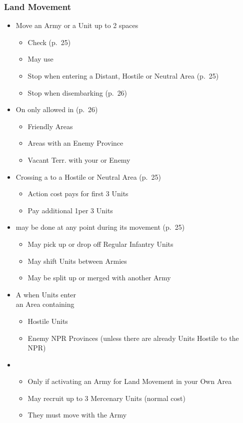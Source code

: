 \documentclass[10pt]{article}
\begin{document}
\subsubsection*{Land Movement}
\begin{itemize}
	\item Move an Army or a Unit up to 2 spaces
	\begin{itemize}
		\item {}Check  (p.~25)
		\item {}May use 
		\item Stop when entering a Distant, Hostile or Neutral Area (p.~25)
		\item Stop when disembarking (p.~26)
	\end{itemize}
	\item On  only allowed in (p.~26)
	\begin{itemize}
		\item Friendly Areas
		\item Areas with an Enemy Province
		\item Vacant Terr. with your or Enemy \claim
	\end{itemize}
	\item Crossing a  to a Hostile or Neutral Area (p.~25)
	\begin{itemize}
		\item Action cost pays for first 3 Units
		\item Pay additional 1\milpower per 3 Units
	\end{itemize}
	\item {} may be done at any point during its movement (p.~25)
	\begin{itemize}
		\item May pick up or drop off Regular Infantry Units
		\item May shift Units between Armies
		\item May be split up or merged with another Army
	\end{itemize}
	\item A  when Units enter\\
	an Area containing
	\begin{itemize}
		\item Hostile Units
		\item Enemy NPR Provinces (unless there are already Units Hostile to the NPR)
	\end{itemize}
	\item {}
	\begin{itemize}
		\item Only if activating an Army for Land Movement in your Own Area
		\item May recruit up to 3 Mercenary Units (normal cost)
		\item They must move with the Army
	\end{itemize}
\end{itemize}
\end{document}
